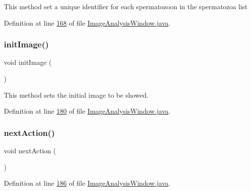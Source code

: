 This method set a unique identifier for each spermatozoon in the spermatozoa list 

Definition at line \hyperlink{_image_analysis_window_8java_source_l00168}{168} of file \hyperlink{_image_analysis_window_8java_source}{Image\+Analysis\+Window.\+java}.

\hypertarget{classgui_1_1_image_analysis_window_a2ef8b75d07db675fb28ce54cc00713f0}{}\label{classgui_1_1_image_analysis_window_a2ef8b75d07db675fb28ce54cc00713f0} 
\subsubsection{\texorpdfstring{init\+Image()}{initImage()}}
{\footnotesize\ttfamily void init\+Image (\begin{DoxyParamCaption}{ }\end{DoxyParamCaption})}

This method sets the initial image to be showed. 

Definition at line \hyperlink{_image_analysis_window_8java_source_l00180}{180} of file \hyperlink{_image_analysis_window_8java_source}{Image\+Analysis\+Window.\+java}.

\hypertarget{classgui_1_1_image_analysis_window_a2fcbb99ba607aa4f115acdfa4b2bc7f7}{}\label{classgui_1_1_image_analysis_window_a2fcbb99ba607aa4f115acdfa4b2bc7f7} 
\subsubsection{\texorpdfstring{next\+Action()}{nextAction()}}
{\footnotesize\ttfamily void next\+Action (\begin{DoxyParamCaption}{ }\end{DoxyParamCaption})\hspace{0.3cm}{\ttfamily [protected]}}



Definition at line \hyperlink{_image_analysis_window_8java_source_l00186}{186} of file \hyperlink{_image_analysis_window_8java_source}{Image\+Analysis\+Window.\+java}.

\hypertarget{classgui_1_1_image_analysis_window_ae063bb485c7ec0a4a2eaf55d38397be1}{}\label{classgui_1_1_image_analysis_window_ae063bb485c7ec0a4a2eaf55d38397be1} 
